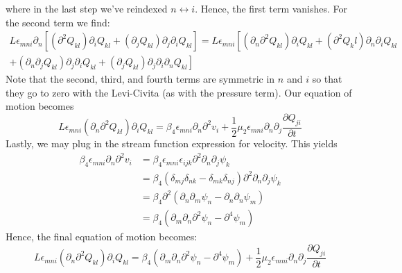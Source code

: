 \documentclass[reqno]{article}
\begin{document}
	where in the last step we've reindexed $n \leftrightarrow i$. Hence, the first term vanishes. For the second term we find:
	\begin{multline}
		L\epsilon_{mni}\partial_n\left[(\partial^2 Q_{kl}) \partial_i Q_{kl} + (\partial_j Q_{kl}) \partial_j \partial_i Q_{kl}\right] = L\epsilon_{mni} \left[ (\partial_n \partial^2 Q_{kl})\partial_i Q_{kl} + (\partial^2 Q_kl)\partial_n \partial_i Q_{kl} \right. \\ \left. + (\partial_n\partial_j Q_{kl})\partial_j\partial_i Q_{kl} + (\partial_j Q_{kl})\partial_j\partial_i\partial_n Q_{kl} \right]
	\end{multline}
	Note that the second, third, and fourth terms are symmetric in $n$ and $i$ so that they go to zero with the Levi-Civita (as with the pressure term). Our equation of motion becomes
	\begin{equation}
		L\epsilon_{mni}(\partial_n \partial^2 Q_{kl})\partial_i Q_{kl} = \beta_4 \epsilon_{mni}\partial_n \partial^2 v_i + \frac{1}{2} \mu_2 \epsilon_{mni} \partial_n \partial_j \frac{\partial Q_{ji}}{\partial t}
	\end{equation}
	Lastly, we may plug in the stream function expression for velocity. This yields
	\begin{equation}
	\begin{split}
		\beta_4 \epsilon_{mni}\partial_n\partial^2 v_i &= \beta_4 \epsilon_{mni}\epsilon_{ijk}\partial^2\partial_n\partial_j \psi_k \\
		&= \beta_4 (\delta_{mj}\delta_{nk} - \delta_{mk}\delta_{nj}) \partial^2\partial_n\partial_j \psi_k \\
		&= \beta_4 \partial^2 \left( \partial_n \partial_m \psi_n - \partial_n \partial_n \psi_m \right) \\
		&= \beta_4 \left( \partial_m \partial_n \partial^2 \psi_n - \partial^4 \psi_m \right)
	\end{split}
	\end{equation}
	Hence, the final equation of motion becomes:
	\begin{equation}
		L\epsilon_{mni}(\partial_n \partial^2 Q_{kl})\partial_i Q_{kl} = \beta_4 \left( \partial_m \partial_n \partial^2 \psi_n - \partial^4 \psi_m \right) + \frac{1}{2} \mu_2 \epsilon_{mni} \partial_n \partial_j \frac{\partial Q_{ji}}{\partial t}
	\end{equation}
\end{document}
